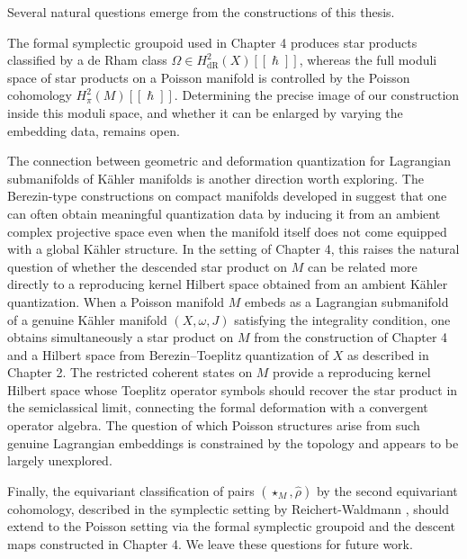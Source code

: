 \documentclass[
  12pt,
  a4paper, oneside
]{report}
\renewcommand{\hbar}{\hslash}
\theoremstyle{bolddef}
\theoremstyle{remark}
\numberwithin{equation}{chapter}
\begin{document}
Several natural questions emerge from the constructions of this thesis.

The formal symplectic groupoid used in Chapter 4 produces star products classified by a de Rham class $\Omega \in H^2_{\mathrm{dR}}(X)[[\hbar]]$, whereas the full moduli space of star products on a Poisson manifold is controlled by the Poisson cohomology $H^2_\pi(M)[[\hbar]]$. Determining the precise image of our construction inside this moduli space, and whether it can be enlarged by varying the embedding data, remains open.

The connection between geometric and deformation quantization for Lagrangian submanifolds of K\"ahler manifolds is another direction worth exploring. The Berezin-type constructions on compact manifolds developed in \cite{dey_berezin_even_2023,dey_rkhs_berezin_odzijewicz} suggest that one can often obtain meaningful quantization data by inducing it from an ambient complex projective space even when the manifold itself does not come equipped with a global K\"ahler structure. In the setting of Chapter 4, this raises the natural question of whether the descended star product on $M$ can be related more directly to a reproducing kernel Hilbert space obtained from an ambient K\"ahler quantization. When a Poisson manifold $M$ embeds as a Lagrangian submanifold of a genuine K\"ahler manifold $(X, \omega, J)$ satisfying the integrality condition, one obtains simultaneously a star product on $M$ from the construction of Chapter 4 and a Hilbert space from Berezin--Toeplitz quantization of $X$ as described in Chapter 2. The restricted coherent states on $M$ provide a reproducing kernel Hilbert space whose Toeplitz operator symbols should recover the star product in the semiclassical limit, connecting the formal deformation with a convergent operator algebra. The question of which Poisson structures arise from such genuine Lagrangian embeddings is constrained by the topology and appears to be largely unexplored.

Finally, the equivariant classification of pairs $(\star_M, \hat{\rho})$ by the second equivariant cohomology, described in the symplectic setting by Reichert-Waldmann \cite{RW}, should extend to the Poisson setting via the formal symplectic groupoid and the descent maps constructed in Chapter 4. We leave these questions for future work.



\end{document}
